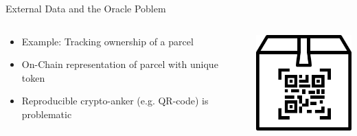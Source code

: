 \documentclass[handout]{beamer}
\begin{document}
\begin{frame}{External Data and the Oracle Poblem}
	\begin{columns}
		\begin{column}{0.6\textwidth}
			\begin{itemize}[<+->]
				\item Example: Tracking ownership of a parcel
				\item On-Chain representation of parcel with unique token
				\item Reproducible crypto-anker (e.g. QR-code) is problematic
			\end{itemize}
		\end{column}
		\begin{column}{0.4\textwidth}
			\includegraphics[width=4cm]{../assets/images/parcel.png}
		\end{column}
	\end{columns}
\end{frame}

\end{document}
